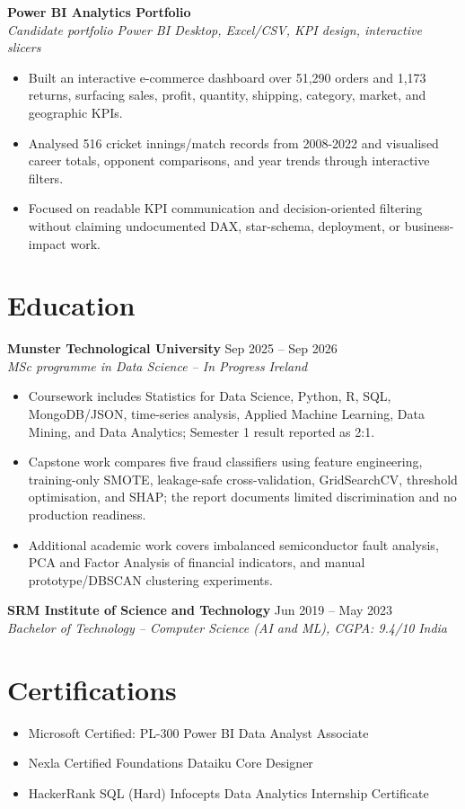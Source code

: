 \documentclass[a4paper,10pt]{article}
\newcommand{\roleheading}[4]{%
  \textbf{#1} \hfill #2\\
  \textit{#3} \hfill \textit{#4}\vspace{3pt}
}
\newenvironment{resumeitems}{\begin{itemize}}{\end{itemize}}
\newcommand{\SecondProjectTitle}{Power BI Analytics Portfolio}
\newcommand{\SecondProjectContext}{Candidate portfolio \textbar{} Power BI Desktop, Excel/CSV, KPI design, interactive slicers}
\newcommand{\SecondProjectBulletOne}{Built an interactive e-commerce dashboard over 51,290 orders and 1,173 returns, surfacing sales, profit, quantity, shipping, category, market, and geographic KPIs.}
\newcommand{\SecondProjectBulletTwo}{Analysed 516 cricket innings/match records from 2008-2022 and visualised career totals, opponent comparisons, and year trends through interactive filters.}
\newcommand{\SecondProjectBulletThree}{Focused on readable KPI communication and decision-oriented filtering without claiming undocumented DAX, star-schema, deployment, or business-impact work.}
\begin{document}
\textbf{\SecondProjectTitle}\\
\textit{\SecondProjectContext}
\begin{resumeitems}
\item \SecondProjectBulletOne
\item \SecondProjectBulletTwo
\item \SecondProjectBulletThree
\end{resumeitems}

\section{Education}

\roleheading{Munster Technological University}{Sep 2025 -- Sep 2026}{MSc programme in Data Science -- In Progress}{Ireland}
\begin{resumeitems}
  \item Coursework includes Statistics for Data Science, Python, R, SQL, MongoDB/JSON, time-series analysis, Applied Machine Learning, Data Mining, and Data Analytics; Semester 1 result reported as 2:1.
  \item Capstone work compares five fraud classifiers using feature engineering, training-only SMOTE, leakage-safe cross-validation, GridSearchCV, threshold optimisation, and SHAP; the report documents limited discrimination and no production readiness.
  \item Additional academic work covers imbalanced semiconductor fault analysis, PCA and Factor Analysis of financial indicators, and manual prototype/DBSCAN clustering experiments.
\end{resumeitems}

\roleheading{SRM Institute of Science and Technology}{Jun 2019 -- May 2023}{Bachelor of Technology -- Computer Science (AI and ML), CGPA: 9.4/10}{India}

\section{Certifications}
\begin{resumeitems}
  \item Microsoft Certified: PL-300 Power BI Data Analyst Associate
  \item Nexla Certified Foundations \textbar{} Dataiku Core Designer
  \item HackerRank SQL (Hard) \textbar{} Infocepts Data Analytics Internship Certificate
\end{resumeitems}
\end{document}

